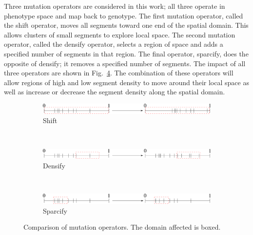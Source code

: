 \documentclass{article}
\begin{document}
Three mutation operators are considered in this work; all three operate in phenotype space and map back to genotype. The first mutation operator, called the shift operator, moves all segments toward one end of the spatial domain. This allows clusters of small segments to explore local space. The second mutation operator, called the densify operator, selects a region of space and adds a specified number of segments in that region. The final operator, sparcify, does the opposite of densify; it removes a specified number of segments. The impact of all three operators are shown in Fig.~\ref{fig:mutations}. The combination of these operators will allow regions of high and low segment density to move around their local space as well as increase or decrease the segment density along the spatial domain.
\begin{figure}
    \centering
    \begin{subfigure}[b]{\textwidth}
    	    \includegraphics[width=\textwidth]{mutate_shift}
    	    \caption{Shift}
    	    \label{fig:mutate_shift}
    	\end{subfigure}
    	~
    	\begin{subfigure}[b]{\textwidth}
    	    \includegraphics[width=\textwidth]{mutate_densify}
    	    \caption{Densify}
    	    \label{fig:mutate_densify}
    	\end{subfigure}
    ~
    	\begin{subfigure}[b]{\textwidth}
    	    \includegraphics[width=\textwidth]{mutate_sparcify}
    	    \caption{Sparcify}
    	    \label{fig:mutate_sparcify}
    	\end{subfigure}
    \caption{Comparison of mutation operators. The domain affected is boxed.}
    \label{fig:mutations}
\end{figure}

\end{document}
